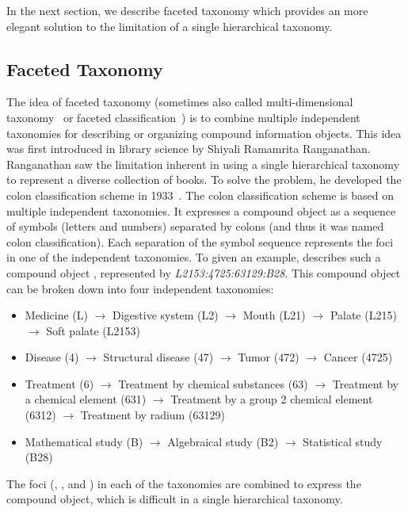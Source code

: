 In the next section, we describe faceted taxonomy which provides an more elegant solution to the limitation of a single hierarchical taxonomy.

\subsection{Faceted Taxonomy}
\label{sec:bg-ftaxonomy}
The idea of faceted taxonomy (sometimes also called multi-dimensional  taxonomy~\cite{sacco2009dynamic} or faceted classification~\cite{tunkelang2009faceted}) is to combine multiple independent taxonomies for describing or organizing compound information objects. This idea was first introduced in library science by Shiyali Ramamrita Ranganathan. Ranganathan saw the limitation inherent in using a single hierarchical taxonomy to represent a
diverse collection of books. To solve the problem, he developed the colon classification scheme in 1933~\cite{ranganathan1933colon}. The colon classification scheme is based on multiple independent taxonomies. It expresses a compound object as a sequence of symbols (letters and numbers) separated by colons (and thus it was named colon classification). Each separation of the symbol sequence represents the foci in one of the independent taxonomies. To given an example, \citet{ranganathan1950classification} describes such a compound object  , represented by \textit{L2153:4725:63129:B28}. This compound object can be broken down into four independent taxonomies:
\begin{itemize}
 \item Medicine (L) $\rightarrow$ Digestive system (L2) $\rightarrow$ Mouth (L21) $\rightarrow$ Palate (L215) $\rightarrow$ Soft palate (L2153)
\item Disease (4) $\rightarrow$ Structural disease (47) $\rightarrow$ Tumor (472) $\rightarrow$ Cancer (4725)
\item Treatment (6) $\rightarrow$ Treatment by chemical substances (63) $\rightarrow$ Treatment by a chemical element (631) $\rightarrow$ Treatment by a group 2 chemical element (6312) $\rightarrow$ Treatment by radium (63129)
\item Mathematical study (B) $\rightarrow$ Algebraical study (B2) $\rightarrow$ Statistical study (B28)
\end{itemize}
The foci (, ,  and ) in each of the taxonomies are combined to express the compound object, which is difficult in a single hierarchical taxonomy.

